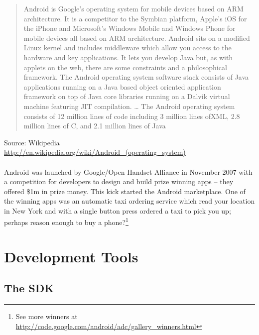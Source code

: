 \documentclass[12pt, a4paper, twoside]{book}
\begin{document}
\begin{framed}
\begin{quote}
Android is Google's operating system for mobile devices based on ARM architecture. It is a competitor to the Symbian platform, Apple's iOS for the iPhone and Microsoft's Windows Mobile and Windows Phone for mobile devices all based on ARM architecture.
Android sits on a modified Linux kernel and includes middleware which allow you access to the hardware and key applications. It lets you develop Java but, as with applets on the web, there are some constraints and a philosophical framework.
The Android operating system software stack consists of Java applications running on a Java based object oriented application framework on top of Java core libraries running on a Dalvik virtual machine featuring JIT compilation. … The Android operating system consists of 12 million lines of code including 3 million lines ofXML, 2.8 million lines of C, and 2.1 million lines of Java
\end{quote}

{\begin{flushright}Source: Wikipedia\\\url{http://en.wikipedia.org/wiki/Android_(operating_system)}\end{flushright}}
\end{framed}

\paragraph{} Android was launched by Google/Open Handset Alliance in November 2007 with a competition for developers to design and build prize winning apps – they offered \$1m in prize money. This kick started the Android marketplace. One of the winning apps was an automatic taxi ordering service which read your location in New York and with a single button press ordered a taxi to pick you up; perhaps reason enough to buy a phone?\footnote{See more winners at \url{http://code.google.com/android/adc/gallery_winners.html}}


\section{Development Tools}
\subsection{The SDK}
\end{document}
